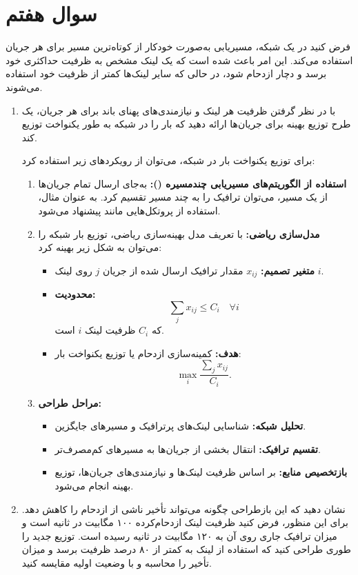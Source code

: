 \section{سوال هفتم}

فرض کنید در یک شبکه، مسیریابی به‌صورت خودکار از کوتاه‌ترین مسیر برای هر جریان استفاده می‌کند. این امر باعث شده است که یک لینک مشخص به ظرفیت حداکثری خود برسد و دچار ازدحام شود، در حالی که سایر لینک‌ها کمتر از ظرفیت خود استفاده می‌شوند.

\begin{enumerate}
	\item 
	با در نظر گرفتن ظرفیت هر لینک و نیازمندی‌های پهنای باند برای هر جریان، یک طرح توزیع بهینه برای جریان‌ها ارائه دهید که بار را در شبکه به طور یکنواخت توزیع کند.
	
	\begin{qsolve}
		برای توزیع یکنواخت بار در شبکه، می‌توان از رویکردهای زیر استفاده کرد:
		
		\begin{enumerate}
			\item \textbf{استفاده از الگوریتم‌های مسیریابی چندمسیره ():} 
			به‌جای ارسال تمام جریان‌ها از یک مسیر، می‌توان ترافیک را به چند مسیر تقسیم کرد. به عنوان مثال، استفاده از پروتکل‌هایی مانند  پیشنهاد می‌شود.
			
			\item \textbf{مدل‌سازی ریاضی:} 
			با تعریف مدل بهینه‌سازی ریاضی، توزیع بار شبکه را می‌توان به شکل زیر بهینه کرد:
			\begin{itemize}
				\item \textbf{متغیر تصمیم:} \( x_{ij} \) مقدار ترافیک ارسال شده از جریان \( j \) روی لینک \( i \).
				\item \textbf{محدودیت:} 
				\[
				\sum_j x_{ij} \leq C_i \quad \forall i
				\]
				که \( C_i \) ظرفیت لینک \( i \) است.
				\item \textbf{هدف:} 
				کمینه‌سازی ازدحام یا توزیع یکنواخت بار:
				\[
				\max_i \frac{\sum_j x_{ij}}{C_i}.
				\]
			\end{itemize}
			
			\item \textbf{مراحل طراحی:}
			\begin{itemize}
				\item \textbf{تحلیل شبکه:} شناسایی لینک‌های پرترافیک و مسیرهای جایگزین.
				\item \textbf{تقسیم ترافیک:} انتقال بخشی از جریان‌ها به مسیرهای کم‌مصرف‌تر.
				\item \textbf{بازتخصیص منابع:} بر اساس ظرفیت لینک‌ها و نیازمندی‌های جریان‌ها، توزیع بهینه انجام می‌شود.
			\end{itemize}
		\end{enumerate}
	\end{qsolve}
	
	
	\item 
	نشان دهید که این بازطراحی چگونه می‌تواند تأخیر ناشی از ازدحام را کاهش دهد. برای این منظور، فرض کنید ظرفیت لینک ازدحام‌کرده ۱۰۰ مگابیت در ثانیه است و میزان ترافیک جاری روی آن به ۱۲۰ مگابیت در ثانیه رسیده است. توزیع جدید را طوری طراحی کنید که استفاده از لینک به کمتر از ۸۰ درصد ظرفیت برسد و میزان تأخیر را محاسبه و با وضعیت اولیه مقایسه کنید.
\end{enumerate}


